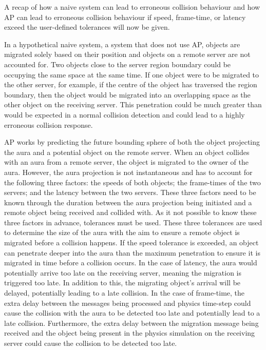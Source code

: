 A recap of how a naive system can lead to erroneous collision behaviour and how AP can lead to erroneous collision behaviour if speed, frame-time, or latency exceed the user-defined tolerances will now be given.

In a hypothetical naive system, a system that does not use AP, objects are migrated solely based on their position and objects on a remote server are not accounted for. Two objects close to the server region boundary could be occupying the same space at the same time. If one object were to be migrated to the other server, for example, if the centre of the object has traversed the region boundary, then the object would be migrated into an overlapping space as the other object on the receiving server. This penetration could be much greater than would be expected in a normal collision detection and could lead to a highly erroneous collision response.

AP works by predicting the future bounding sphere of both the object projecting the aura and a potential object on the remote server. When an object collides with an aura from a remote server, the object is migrated to the owner of the aura. However, the aura projection is not instantaneous and has to account for the following three factors: the speeds of both objects; the frame-times of the two servers; and the latency between the two servers. These three factors need to be known through the duration between the aura projection being initiated and a remote object being received and collided with. As it not possible to know these three factors in advance, tolerances must be used. These three tolerances are used to determine the size of the aura with the aim to ensure a remote object is migrated before a collision happens. If the speed tolerance is exceeded, an object can penetrate deeper into the aura than the maximum penetration to ensure it is migrated in time before a collision occurs. In the case of latency, the aura would potentially arrive too late on the receiving server, meaning the migration is triggered too late. In addition to this, the migrating object's arrival will be delayed, potentially leading to a late collision. In the case of frame-time, the extra delay between the messages being processed and physics time-step could cause the collision with the aura to be detected too late and potentially lead to a late collision. Furthermore, the extra delay between the migration message being received and the object being present in the physics simulation on the receiving server could cause the collision to be detected too late.

